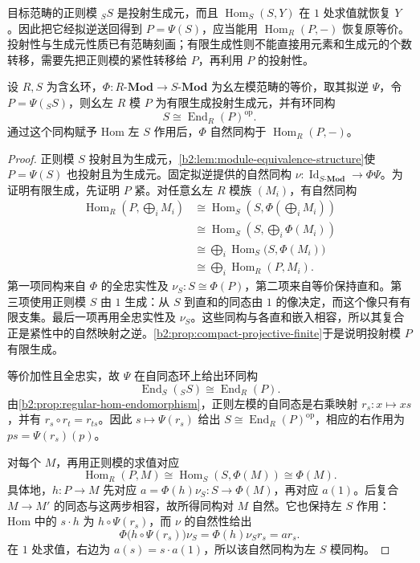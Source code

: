目标范畴的正则模 \({}_SS\) 是投射生成元，而且 \(\operatorname{Hom}_S(S,Y)\) 在 \(1\) 处求值就恢复 \(Y\)。因此把它经拟逆送回得到 \(P=\Psi(S)\)，应当能用 \(\operatorname{Hom}_R(P,-)\) 恢复原等价。投射性与生成元性质已有范畴刻画；有限生成性则不能直接用元素和生成元的个数转移，需要先把正则模的紧性转移给 \(P\)，再利用 \(P\) 的投射性。

\begin{theorem}[由范畴等价恢复投射生成元]\label{b2:thm:morita-converse}
	设 \(R,S\) 为含幺环，\(\Phi:R\text{-}\mathbf{Mod}\rightarrow S\text{-}\mathbf{Mod}\) 为幺左模范畴的等价，取其拟逆 \(\Psi\)，令 \(P=\Psi({}_SS)\)，则幺左 \(R\) 模 \(P\) 为有限生成投射生成元，并有环同构
	\[
		S\cong\operatorname{End}_R(P)^{\mathrm{op}}.
	\]
	通过这个同构赋予 Hom 左 \(S\) 作用后，\(\Phi\) 自然同构于 \(\operatorname{Hom}_R(P,-)\)。
\end{theorem}
\begin{proof}
	正则模 \(S\) 投射且为生成元，\cref{b2:lem:module-equivalence-structure}使 \(P=\Psi(S)\) 也投射且为生成元。固定拟逆提供的自然同构 \(\nu:\operatorname{Id}_{S\text{-}\mathbf{Mod}}\rightarrow\Phi\Psi\)。为证明有限生成，先证明 \(P\) 紧。对任意幺左 \(R\) 模族 \((M_i)\)，有自然同构
	\[
		\begin{aligned}
			\operatorname{Hom}_R\left(P,\bigoplus_iM_i\right) &\cong\operatorname{Hom}_S\left(S,\Phi\left(\bigoplus_iM_i\right)\right)\\
			&\cong\operatorname{Hom}_S\left(S,\bigoplus_i\Phi(M_i)\right)\\
			&\cong\bigoplus_i\operatorname{Hom}_S\bigl(S,\Phi(M_i)\bigr)\\
			&\cong\bigoplus_i\operatorname{Hom}_R(P,M_i).
		\end{aligned}
	\]
	第一项同构来自 \(\Phi\) 的全忠实性及 \(\nu_S:S\cong\Phi(P)\)，第二项来自等价保持直和。第三项使用正则模 \(S\) 由 \(1\) 生成：从 \(S\) 到直和的同态由 \(1\) 的像决定，而这个像只有有限支集。最后一项再用全忠实性及 \(\nu_S\)。这些同构与各直和嵌入相容，所以其复合正是紧性中的自然映射之逆。\cref{b2:prop:compact-projective-finite}于是说明投射模 \(P\) 有限生成。

	等价加性且全忠实，故 \(\Psi\) 在自同态环上给出环同构
	\[
		\operatorname{End}_S({}_SS)\cong\operatorname{End}_R(P).
	\]
	由\cref{b2:prop:regular-hom-endomorphism}，正则左模的自同态是右乘映射 \(r_s:x\mapsto xs\)，并有 \(r_s\circ r_t=r_{ts}\)。因此 \(s\mapsto\Psi(r_s)\) 给出 \(S\cong\operatorname{End}_R(P)^{\mathrm{op}}\)，相应的右作用为 \(ps=\Psi(r_s)(p)\)。

	对每个 \(M\)，再用正则模的求值对应
	\[
		\operatorname{Hom}_R(P,M) \cong\operatorname{Hom}_S(S,\Phi(M)) \cong\Phi(M).
	\]
	具体地，\(h:P\rightarrow M\) 先对应 \(a=\Phi(h)\nu_S:S\rightarrow\Phi(M)\)，再对应 \(a(1)\)。后复合 \(M\rightarrow M'\) 的同态与这两步相容，故所得同构对 \(M\) 自然。它也保持左 \(S\) 作用：Hom 中的 \(s\cdot h\) 为 \(h\circ\Psi(r_s)\)，而 \(\nu\) 的自然性给出
	\[
		\Phi\bigl(h\circ\Psi(r_s)\bigr)\nu_S =\Phi(h)\nu_S r_s=a r_s.
	\]
	在 \(1\) 处求值，右边为 \(a(s)=s\cdot a(1)\)，所以该自然同构为左 \(S\) 模同构。
\end{proof}

